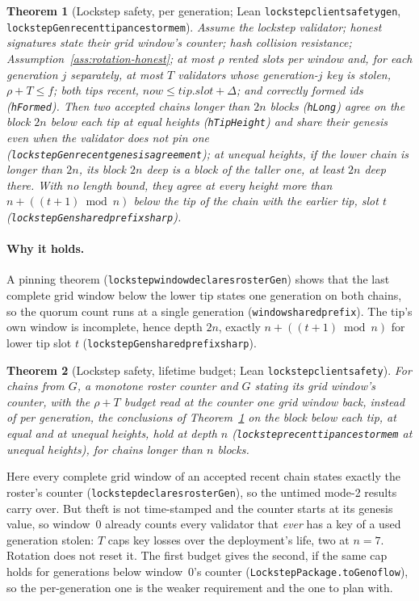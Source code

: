 \documentclass[10pt]{article}
\newtheorem{theorem}{Theorem}
\DeclareRobustCommand{\code}[1]{{\renewcommand{\_}{\textunderscore\allowbreak}\texttt{#1}}}
\newcommand{\fmax}{\ensuremath{f}}
\begin{document}
\begin{theorem}[Lockstep safety, per generation; Lean
\code{lockstep\_client\_safety\_gen},\hfil{}
\code{lockstepGen\_recent\_tip\_ancestor\_mem}]\label{thm:lock-gen}
Assume the lockstep validator; honest signatures state their grid
window's counter; hash collision resistance;
Assumption~\ref{ass:rotation-honest}; at most $\rho$ rented slots per
window and, for each generation $j$ separately, at most $T$ validators
whose generation-$j$ key is stolen, $\rho + T \le \fmax$; both tips
recent, $\mathit{now} \le \mathit{tip.slot} + \Delta$; and correctly
formed ids (\code{hFormed}). Then two accepted chains longer than $2n$
blocks (\code{hLong}) agree on the block $2n$ below each tip at equal
heights (\code{hTipHeight}) and share their genesis even when the
validator does not pin one (\code{lockstepGen\_recent\_genesis\_agreement});
at unequal heights, if the lower chain is longer than $2n$, its block
$2n$ deep is a block of the taller one, at least $2n$ deep there. With
no length bound, they agree at every height more than
$n + ((t+1) \bmod n)$ below the tip of the chain with the earlier tip,
slot $t$ (\code{lockstepGen\_shared\_prefix\_sharp}).
\end{theorem}

\paragraph{Why it holds.} A pinning theorem
(\code{lockstep\_window\_declares\_rosterGen}) shows that the last
complete grid window below the lower tip states one generation on both
chains, so the quorum count runs at a single generation
(\code{window\_shared\_prefix}). The tip's own window is incomplete,
hence depth $2n$, exactly $n + ((t{+}1) \bmod n)$ for lower tip slot $t$
(\code{lockstepGen\_shared\_prefix\_sharp}).

\begin{theorem}[Lockstep safety, lifetime budget; Lean
\code{lockstep\_client\_safety}]\label{thm:lock}
For chains from $G$, a monotone roster counter and $G$ stating its grid
window's counter, with the $\rho + T$ budget read at the counter one grid window back,
instead of per generation, the conclusions of Theorem~\ref{thm:lock-gen}
on the block below each tip, at equal and at unequal heights, hold at
depth $n$ (\code{lockstep\_recent\_tip\_ancestor\_mem} at unequal
heights), for chains longer than $n$ blocks.
\end{theorem}

Here every complete grid window of an accepted recent chain states
exactly the roster's counter (\code{lockstep\_declares\_rosterGen}), so
the untimed mode-2 results carry over. But theft is not time-stamped and
the counter starts at its genesis value, so window~$0$ already counts
every validator that \emph{ever} has a key of a used generation stolen:
$T$ caps key losses over the deployment's life, two at $n = 7$.
Rotation does not reset it. The first budget gives the second, if the
same cap holds for generations below window~$0$'s counter
(\code{LockstepPackage.toGen\_of\_low}), so the per-generation one is
the weaker requirement and the one to plan with.
\end{document}
